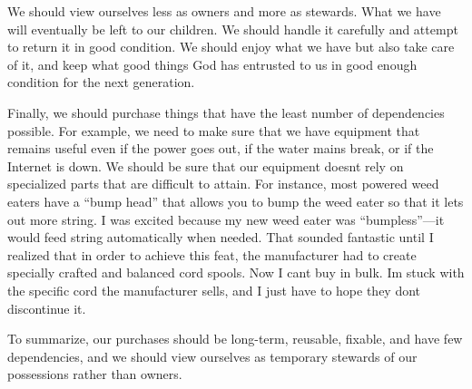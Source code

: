 \documentclass[letterpaper]{article}
\begin{document}
{\color{black}
We should view ourselves less as owners and more as stewards. What we
have will eventually be left to our children. We should handle it
carefully and attempt to return it in good condition. We should enjoy
what we have but also take care of it, and keep what good things God
has entrusted to us in good enough condition for the next generation.}

{\color{black}
Finally, we should purchase things that have the least number of
dependencies possible.
\textcolor[rgb]{0.32941177,0.5529412,0.83137256}{For example, w}e need
to make sure that we have equipment that remains useful even if the
power goes out, if the water mains break, or if the Internet is down.
We should be sure that our equipment doesn{\textquotesingle}t rely on
specialized parts that are difficult to attain. For instance, most
powered weed eaters have a “bump head” that allows you to bump the weed
eater so that it lets out more string. I was excited because my new
weed eater was “bumpless”—it would feed string automatically when
needed. That sounded fantastic until I realized that in order to
achieve this feat, the manufacturer had to create specially crafted and
balanced cord spools. Now I can{\textquotesingle}t buy in bulk.
I{\textquotesingle}m stuck with the specific cord the manufacturer
sells, and I just have to hope they don{\textquotesingle}t discontinue
it.}

{\color{black}
To summarize, our purchases should be long-term, reusable, fixable, and
have few dependencies, and we should view ourselves as temporary
stewards of our possessions rather than owners.}
\end{document}
